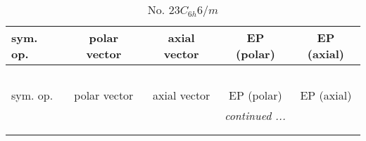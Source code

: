 \documentclass[fleqn,10pt,landscape]{jsarticle}
\begin{document}
\newpage
\begin{center}
\renewcommand{\arraystretch}{1.3}
\begin{longtable}{lcccc}
\caption{No. 23\quad$C_{6h}$\quad$6/m$\quad[ hexagonal ]}
 \\
 \hline \hline
sym. op. & polar vector & axial vector & EP (polar) & EP (axial) \\ \hline \endfirsthead

\multicolumn{4}{l}{\tablename\ \thetable{}} \\
 \hline \hline
sym. op. & polar vector & axial vector & EP (polar) & EP (axial) \\ \hline \endhead

 \hline \hline
\multicolumn{4}{r}{\footnotesize\it continued ...} \\ \endfoot

 \hline \hline
\multicolumn{4}{r}{} \\ \endlastfoot


\end{longtable}
\end{center}
\end{document}
